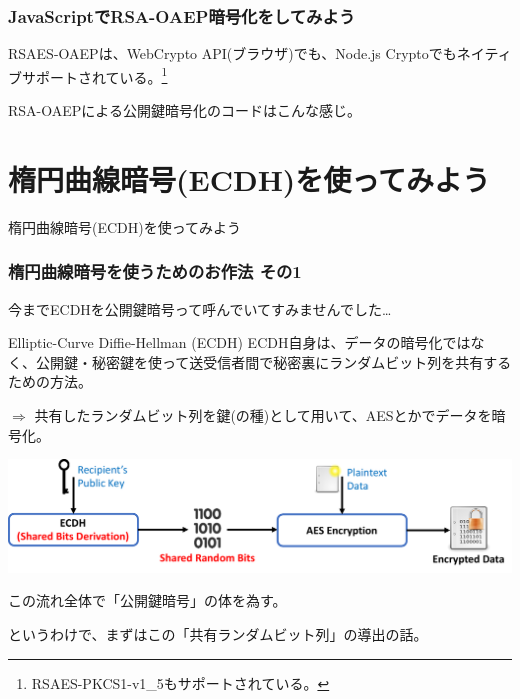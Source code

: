 \documentclass[12pt,dvipdfmx]{beamer}
\begin{document}
\begin{frame}
\frametitle{JavaScriptでRSA-OAEP暗号化をしてみよう}
RSAES-OAEPは、WebCrypto API(ブラウザ)でも、Node.js Cryptoでもネイティブサポートされている。\footnote[frame]{\scriptsize RSAES-PKCS1-v1\_5もサポートされている。}

\end{frame}

\begin{frame}
RSA-OAEPによる公開鍵暗号化のコードはこんな感じ。
\end{frame}


\section{楕円曲線暗号(ECDH)を使ってみよう}
\begin{frame}
\centering
{\Large 楕円曲線暗号(ECDH)を使ってみよう}
\end{frame}

\begin{frame}
\frametitle{楕円曲線暗号を使うためのお作法 その1}

今までECDHを公開鍵暗号って呼んでいてすみませんでした…

\begin{block}{\small Elliptic-Curve Diffie-Hellman (ECDH)}
ECDH自身は、データの暗号化ではなく、公開鍵・秘密鍵を使って\alert{送受信者間で秘密裏にランダムビット列を共有するための方法}。
\end{block}

$\Rightarrow$ 共有したランダムビット列を鍵(の種)として用いて、AESとかでデータを暗号化。

\begin{center}
\includegraphics[width=\linewidth]{Figs/ecdh-flow01.pdf}

この流れ全体で「公開鍵暗号」の体を為す。
\end{center}

というわけで、まずはこの「共有ランダムビット列」の導出の話。
\end{frame}
\end{document}

